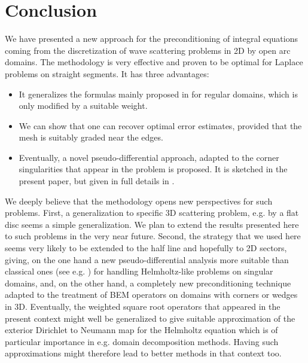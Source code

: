 \documentclass[a4paper]{subfiles}
\begin{document}
\section{Conclusion} 
We have presented a new approach for the preconditioning of integral equations coming from the discretization of wave scattering problems
in 2D by open arc domains. The methodology is very effective and proven to be optimal for Laplace problems on straight segments. It has
three advantages:
\begin{itemize}
\item It generalizes the formulas mainly proposed in \cite{antoine2007generalized} for regular domains, which is only modified by a suitable weight.
\item We can show that one can recover optimal error estimates, provided that the mesh is suitably graded near the edges.
\item Eventually, a novel pseudo-differential approach, adapted to the corner singularities that appear in the problem is proposed.
It is sketched in the present paper, but given in full details in \cite{averseng}.
\end{itemize}
We deeply believe that the methodology opens new perspectives for such problems. First, a generalization to specific 3D scattering
problem, e.g. by a flat disc seems a simple generalization. We plan to extend the results presented here to such problems in the very
near future. Second, the strategy that we used here seems very likely to be extended to the half line and hopefully to 2D sectors, giving,
on the one hand a new pseudo-differential analysis more suitable than classical ones (see e.g. \cite{melrose,olapaivarinta,schulze1,schulze2})
for handling Helmholtz-like problems on singular domains, and, on the other hand, a completely new preconditioning  technique adapted
to the treatment of BEM operators on domains with corners or wedges in 3D. Eventually, the weighted square root operators that appeared
in the present context might well be generalized to give suitable approximation of the exterior Dirichlet to Neumann map for the Helmholtz equation
which is of particular importance in e.g. domain decomposition methods. Having such approximations might therefore lead to better
methods in that context too.
	
\end{document}
